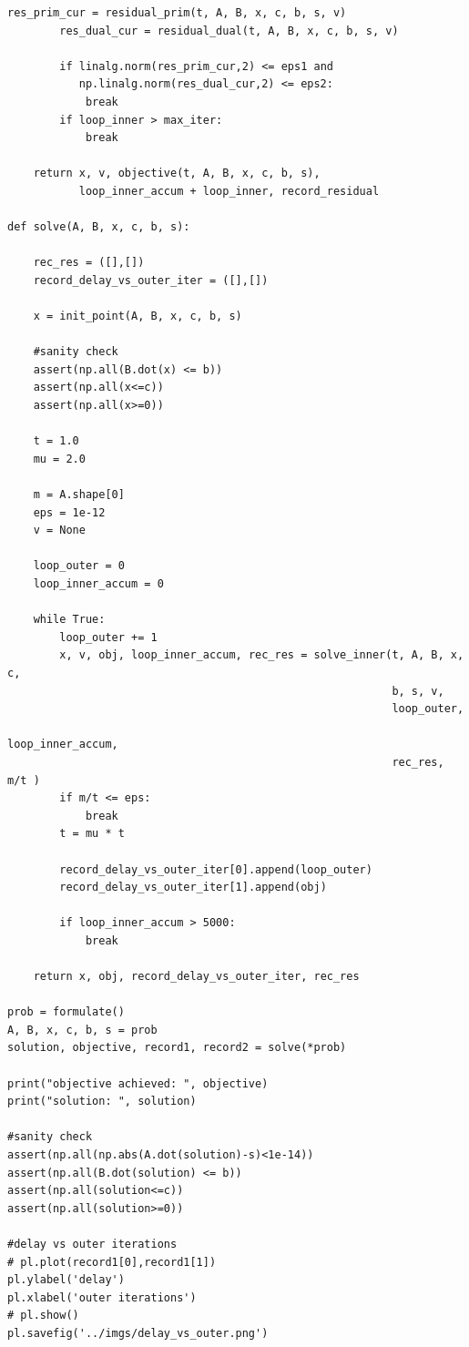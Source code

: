 \documentclass[12pt,letter]{article}
\begin{document}
\begin{enumerate}
\begin{itemize}
\begin{Verbatim}[fontsize=\small]
        res_prim_cur = residual_prim(t, A, B, x, c, b, s, v)
        res_dual_cur = residual_dual(t, A, B, x, c, b, s, v)

        if linalg.norm(res_prim_cur,2) <= eps1 and
           np.linalg.norm(res_dual_cur,2) <= eps2:
            break
        if loop_inner > max_iter:
            break

    return x, v, objective(t, A, B, x, c, b, s),
           loop_inner_accum + loop_inner, record_residual
        
def solve(A, B, x, c, b, s):

    rec_res = ([],[])
    record_delay_vs_outer_iter = ([],[])
    
    x = init_point(A, B, x, c, b, s)

    #sanity check
    assert(np.all(B.dot(x) <= b))
    assert(np.all(x<=c))
    assert(np.all(x>=0))

    t = 1.0
    mu = 2.0

    m = A.shape[0]
    eps = 1e-12
    v = None

    loop_outer = 0
    loop_inner_accum = 0
    
    while True:
        loop_outer += 1
        x, v, obj, loop_inner_accum, rec_res = solve_inner(t, A, B, x, c,
                                                           b, s, v,
                                                           loop_outer,
                                                           loop_inner_accum,
                                                           rec_res, m/t )
        if m/t <= eps:
            break
        t = mu * t
        
        record_delay_vs_outer_iter[0].append(loop_outer)
        record_delay_vs_outer_iter[1].append(obj)
        
        if loop_inner_accum > 5000:
            break
            
    return x, obj, record_delay_vs_outer_iter, rec_res

prob = formulate()
A, B, x, c, b, s = prob
solution, objective, record1, record2 = solve(*prob)

print("objective achieved: ", objective)
print("solution: ", solution)

#sanity check
assert(np.all(np.abs(A.dot(solution)-s)<1e-14))
assert(np.all(B.dot(solution) <= b))
assert(np.all(solution<=c))
assert(np.all(solution>=0))

#delay vs outer iterations
# pl.plot(record1[0],record1[1])
pl.ylabel('delay')
pl.xlabel('outer iterations')
# pl.show()
pl.savefig('../imgs/delay_vs_outer.png')


\end{Verbatim}
\end{itemize}
\end{enumerate}
\end{document}
